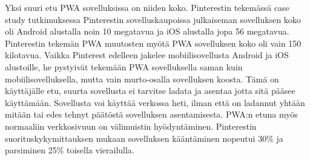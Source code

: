 \documentclass{tktltiki}
\begin{document}
Yksi suuri etu PWA sovelluksissa on niiden koko. Pinterestin tekemässä case study tutkimuksessa \cite{Osmani} Pinterestin sovelluskaupoissa julkaiseman sovelluksen koko oli Android alustalla noin 10 megatavua ja iOS alustalla jopa 56 megatavua. Pinterestin tekemän PWA muutosten myötä PWA sovelluksen koko oli vain 150 kilotavua. Vaikka Pinterest edelleen jakelee mobiilisovellusta Android ja iOS alustoille, he pystyivät tekemään PWA sovelluksella saman kuin mobiilisovelluksella, mutta vain murto-osalla sovelluksen koosta. Tämä on käyttäjälle etu, suurta sovellusta ei tarvitse ladata ja asentaa jotta sitä pääsee käyttämään. Sovellusta voi käyttää verkossa heti, ilman että on ladannut yhtään mitään tai edes tehnyt päätöstä sovelluksen asentamisesta. PWA:n etuna myös normaaliin verkkosivuun on välimuistin hyödyntäminen. Pinterestin suorituskykymittauksen mukaan sovelluksen kääntäminen nopeutui 30\% ja parsiminen 25\% toisella vierailulla.  

\clearpage
\end{document}
